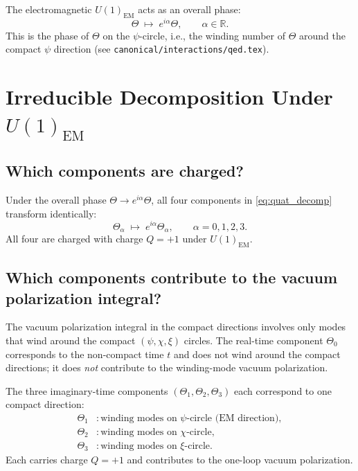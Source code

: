 \documentclass[12pt,a4paper]{article}
\theoremstyle{definition}
\theoremstyle{remark}
\newcommand{\R}{\mathbb{R}}
\begin{document}
The electromagnetic $U(1)_\mathrm{EM}$ acts as an overall phase:
\begin{equation}
  \Theta \;\longmapsto\; e^{i\alpha} \Theta,
  \qquad \alpha \in \R.
  \label{eq:U1EM_action}
\end{equation}
This is the phase of $\Theta$ on the $\psi$-circle, i.e., the winding number
of $\Theta$ around the compact $\psi$ direction (see \texttt{canonical/interactions/qed.tex}).

\section{Irreducible Decomposition Under $U(1)_\mathrm{EM}$}
\label{sec:irrep}

\subsection{Which components are charged?}

Under the overall phase $\Theta \to e^{i\alpha}\Theta$, all four components
in \eqref{eq:quat_decomp} transform identically:
\begin{equation}
  \Theta_\alpha \;\longmapsto\; e^{i\alpha} \Theta_\alpha, \qquad \alpha = 0,1,2,3.
  \label{eq:all_charged}
\end{equation}
All four are charged with charge $Q = +1$ under $U(1)_\mathrm{EM}$.

\subsection{Which components contribute to the vacuum polarization integral?}

The vacuum polarization integral in the compact directions involves only modes
that wind around the compact $(\psi,\chi,\xi)$ circles.  The real-time
component $\Theta_0$ corresponds to the non-compact time $t$ and does not
wind around the compact directions; it does \emph{not} contribute to the
winding-mode vacuum polarization.

The three imaginary-time components $(\Theta_1, \Theta_2, \Theta_3)$ each
correspond to one compact direction:
\begin{align}
  \Theta_1 &: \text{winding modes on }\psi\text{-circle (EM direction)},\\
  \Theta_2 &: \text{winding modes on }\chi\text{-circle},\\
  \Theta_3 &: \text{winding modes on }\xi\text{-circle}.
\end{align}
Each carries charge $Q=+1$ and contributes to the one-loop vacuum polarization.
\end{document}
